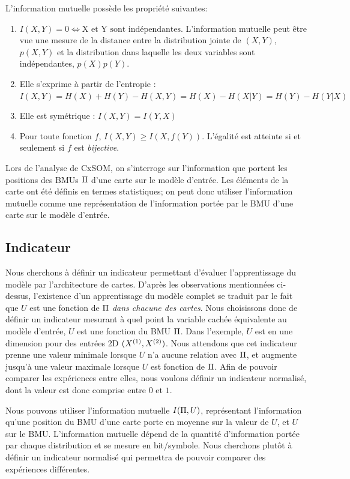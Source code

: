 L'information mutuelle possède les propriété suivantes:
\begin{enumerate}
\item $I(X,Y) = 0 \Leftrightarrow \textrm{X et Y sont indépendantes}$. L'information mutuelle peut être vue une mesure de la distance entre la distribution jointe de $(X,Y)$, $p(X,Y)$ et la distribution dans laquelle les deux variables sont indépendantes, $p(X)p(Y)$.
\item Elle s'exprime à partir de l'entropie : $I(X,Y) = H(X) + H(Y) - H(X,Y) = H(X) - H(X|Y) = H(Y) - H(Y|X)$
\item Elle est symétrique : $I(X,Y) = I(Y,X)$
\item Pour toute fonction $f$, $I(X,Y) \geq I(X,f(Y))$. L'égalité est atteinte si et seulement si $f$ est \emph{bijective}.
\end{enumerate}

Lors de l'analyse de CxSOM, on s'interroge sur l'information que portent les positions des BMUs $\Pi$ d'une carte sur le modèle d'entrée. Les éléments de la carte ont été définis en termes statistiques; on peut donc utiliser l'information mutuelle comme une représentation de l'information portée par le BMU d'une carte sur le modèle d'entrée.

\subsection{Indicateur}

Nous cherchons à définir un indicateur permettant d'évaluer l'apprentissage du modèle par l'architecture de cartes. D'après les observations mentionnées ci-dessus, l'existence d'un apprentissage du modèle complet se traduit par le fait que $U$ est une fonction de $\Pi$ \emph{dans chacune des cartes}.
Nous choisissons donc de définir un indicateur mesurant à quel point la variable cachée équivalente au modèle d'entrée, $U$ est une fonction du BMU $\Pi$.
Dans l'exemple, $U$ est en une dimension pour des entrées 2D $(X^{({1})},X^{({2})})$.
Nous attendons que cet indicateur prenne une valeur minimale lorsque $U$ n'a aucune relation avec $\Pi$, et augmente jusqu'à une valeur maximale lorsque $U$ est fonction de $\Pi$. Afin de pouvoir comparer les expériences entre elles, nous voulons définir un indicateur normalisé, dont la valeur est donc comprise entre $0$ et $1$.

Nous pouvons utiliser l'information mutuelle $I(\Pi, U)$, représentant l'information qu'une position du BMU d'une carte porte en moyenne sur la valeur de $U$, et $U$ sur le BMU.
L'information mutuelle dépend de la quantité d'information portée par chaque distribution et se mesure en bit/symbole. Nous cherchons plutôt à définir un indicateur normalisé qui permettra de pouvoir comparer des expériences différentes.


